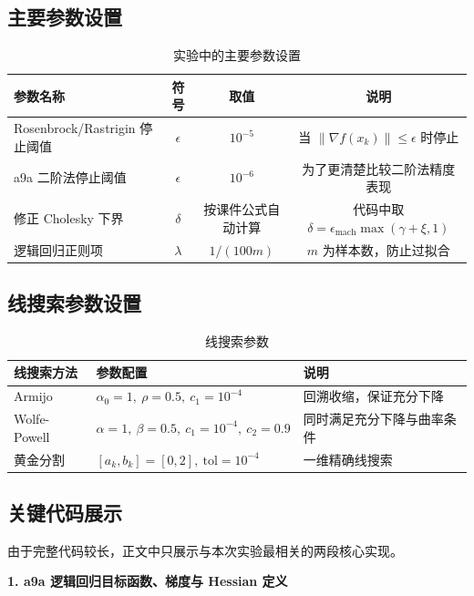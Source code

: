 \documentclass[12pt,a4paper]{ctexart}
\begin{document}
\subsection{主要参数设置}
\begin{table}[H]
\centering
\caption{实验中的主要参数设置}
\label{tab:work2_params_general}
\begin{tabular}{lccc}
\toprule
参数名称 & 符号 & 取值 & 说明 \\
\midrule
Rosenbrock/Rastrigin 停止阈值 & $\epsilon$ & $10^{-5}$ & 当 $\|\nabla f(x_k)\|\le \epsilon$ 时停止 \\
a9a 二阶法停止阈值 & $\epsilon$ & $10^{-6}$ & 为了更清楚比较二阶法精度表现 \\
修正 Cholesky 下界 & $\delta$ & 按课件公式自动计算 & 代码中取 $\delta=\epsilon_{\mathrm{mach}}\max(\gamma+\xi,1)$ \\
逻辑回归正则项 & $\lambda$ & $1/(100m)$ & $m$ 为样本数，防止过拟合 \\
\bottomrule
\end{tabular}
\end{table}

\subsection{线搜索参数设置}
\begin{table}[H]
\centering
\caption{线搜索参数}
\label{tab:work2_params_linesearch}
\begin{tabular}{lll}
\toprule
线搜索方法 & 参数配置 & 说明 \\
\midrule
Armijo & $\alpha_0=1,\ \rho=0.5,\ c_1=10^{-4}$ & 回溯收缩，保证充分下降 \\
Wolfe-Powell & $\alpha=1,\ \beta=0.5,\ c_1=10^{-4},\ c_2=0.9$ & 同时满足充分下降与曲率条件 \\
黄金分割 & $[a_k,b_k]=[0,2],\ \mathrm{tol}=10^{-4}$ & 一维精确线搜索 \\
\bottomrule
\end{tabular}
\end{table}

\subsection{关键代码展示}
由于完整代码较长，正文中只展示与本次实验最相关的两段核心实现。

\textbf{1. a9a 逻辑回归目标函数、梯度与 Hessian 定义}


\end{document}
